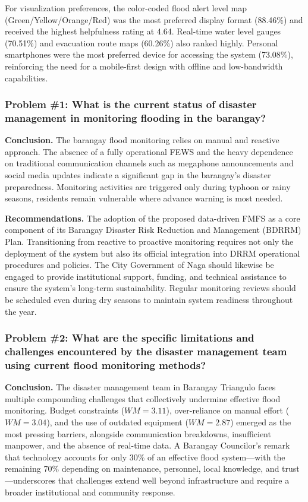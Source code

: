 \documentclass{research}
\begin{document}
For visualization preferences, the color-coded flood alert level map
(Green/Yellow/Orange/Red) was the most preferred display format (88.46\%) and
received the highest helpfulness rating at 4.64. Real-time water level gauges (70.51\%)
and evacuation route maps (60.26\%) also ranked highly. Personal smartphones were the
most preferred device for accessing the system (73.08\%), reinforcing the need for a
mobile-first design with offline and low-bandwidth capabilities.

\subsubsection*{Problem \#1: What is the current status of disaster management in monitoring flooding in the barangay?}

\textbf{Conclusion.} The barangay flood monitoring relies on manual and reactive approach. The absence of a fully operational FEWS and the heavy
dependence on traditional communication channels such as megaphone announcements
and social media updates indicate a significant gap in the barangay's disaster
preparedness. Monitoring activities are triggered only during typhoon or rainy seasons, residents remain vulnerable
where advance warning is most needed.

\textbf{Recommendations.} The  
adoption of the
proposed data-driven FMFS as a core component of its Barangay Disaster Risk
Reduction and Management (BDRRM) Plan. Transitioning from reactive to proactive
monitoring requires not only the deployment of the system but also its official
integration into DRRM operational procedures and policies. The City Government of
Naga should likewise be engaged to provide institutional support, funding, and
technical assistance to ensure the system's long-term sustainability. Regular
monitoring reviews should be scheduled even during dry seasons to maintain system
readiness throughout the year.

\subsubsection*{Problem \#2: What are the specific limitations and challenges encountered by the disaster management team using current flood monitoring methods?}

\textbf{Conclusion.} The disaster management team in Barangay Triangulo faces
multiple compounding challenges that collectively undermine effective flood
monitoring. Budget constraints ($WM = 3.11$), over-reliance on manual effort
($WM = 3.04$), and the use of outdated equipment ($WM = 2.87$) emerged as the
most pressing barriers, alongside communication breakdowns, insufficient manpower,
and the absence of real-time data. A Barangay Councilor's remark that technology
accounts for only 30\% of an effective flood system---with the remaining 70\%
depending on maintenance, personnel, local knowledge, and trust---underscores that
challenges extend well beyond infrastructure and require a broader institutional and
community response.
\end{document}
